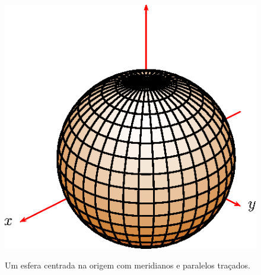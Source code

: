  \begin{figure}%
\centering
 \includegraphics{cap_superficies/figs/figura_1}\label{cap_superficies_esfera}
\caption{Um esfera centrada na origem com meridianos e paralelos traçados.}
\end{figure}
